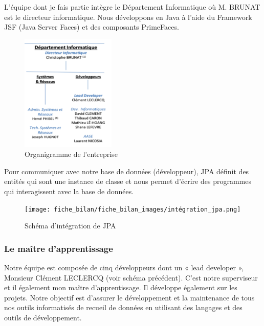 L’équipe dont je fais partie intègre le Département Informatique où M. BRUNAT est le directeur informatique.
Nous développons en Java à l’aide du Framework JSF (Java Server Faces) et
des composants PrimeFaces.
\begin{figure}[H]
    \centering
    \includegraphics[width=0.4\textwidth]{fiche_bilan/fiche_bilan_images/organigramme_info.png} 
    \caption{Organigramme de l'entreprise}
\end{figure}
Pour communiquer avec notre base de données (développeur), JPA définit des
entités qui sont une instance de classe et nous permet d’écrire des
programmes qui interagissent avec la base de données.
\begin{figure}[H]
    \centering
    \texttt{[image: fiche\_bilan/fiche\_bilan\_images/intégration\_jpa.png]} 
    \caption{Schéma d'intégration de JPA}
\end{figure}

\subsubsection{Le maître d'apprentissage}
Notre équipe est composée de cinq développeurs dont un « lead developer »,
Monsieur Clément LECLERCQ (voir schéma précédent). C’est notre superviseur et il
également mon maître d’apprentissage. Il développe également sur les projets.
Notre objectif est d’assurer le développement et la maintenance de tous nos outils informatisés de recueil de données en utilisant des langages et des outils
de développement.
